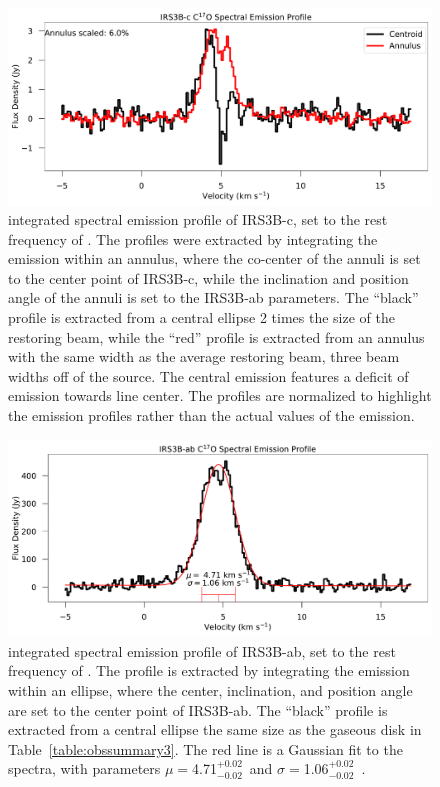 \begin{figure}[H]
  \begin{center}
   \includegraphics[width=\textwidth]{img/c17o-spectra-irs3b-c.pdf}
   \end{center}
   \caption{\cso\space integrated spectral emission profile of IRS3B-c, set to the rest frequency of \cso. The profiles were extracted by integrating the emission within an annulus, where the co-center of the annuli is set to the center point of IRS3B-c, while the inclination and position angle of the annuli is set to the IRS3B-ab parameters. The ``black'' profile is extracted from a central ellipse 2 times the size of the restoring beam, while the ``red'' profile is extracted from an annulus with the same width as the average restoring beam, three beam widths off of the source. The central emission features a deficit of emission towards line center. The profiles are normalized to highlight the emission profiles rather than the actual values of the emission.}\label{fig:irs3bspec}
\end{figure}
\begin{figure}[H]
  \begin{center}
   \includegraphics[width=\textwidth]{img/c17o-spectra-irs3b-ab.pdf}
   \end{center}
   \caption{\cso\space integrated spectral emission profile of IRS3B-ab, set to the rest frequency of \cso. The profile is extracted by integrating the emission within an ellipse, where the center, inclination, and position angle are set to the center point of IRS3B-ab. The ``black'' profile is extracted from a central ellipse the same size as the gaseous disk in Table~\ref{table:obssummary3}. The red line is a Gaussian fit to the spectra, with parameters $\mu=$4.71$^{+0.02}_{-0.02}$~\kms\space and $\sigma=$1.06$^{+0.02}_{-0.02}$~\kms.}\label{fig:irs3babspec}
\end{figure}

